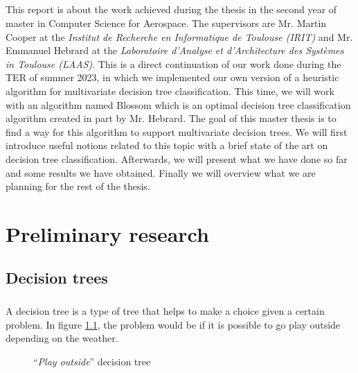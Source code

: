 \documentclass[12pt]{report}
\theoremstyle{definition}
\theoremstyle{definition}
\theoremstyle{definition}
\begin{document}
\paragraph{} This report is about the work achieved during the thesis in the second year of master in Computer
Science for Aerospace. The supervisors are Mr. Martin Cooper at the \textit{Institut de Recherche en Informatique
de Toulouse (IRIT)} and Mr. Emmanuel Hebrard at the \textit{Laboratoire d'Analyse et d'Architecture des Systèmes
in Toulouse (LAAS)}. This is a direct continuation of our work done during the TER of summer 2023, in which we
implemented our own version of a heuristic algorithm for multivariate decision tree classification. This time,
we will work with an algorithm named Blossom which is an optimal decision tree classification algorithm created
in part by Mr. Hebrard. The goal of this master thesis is to find a way for this algorithm to support
multivariate decision trees. We will first introduce useful notions related to this topic with a brief state
of the art on decision tree classification. Afterwards, we will present what we have done so far and some
results we have obtained. Finally we will overview what we are planning for the rest of the thesis.


\chapter{Preliminary research}
\section{Decision trees}

\paragraph{} A decision tree is a type of tree that helps to make a choice given a certain problem. In figure
\ref{fig:tree}, the problem would be if it is possible to go play outside depending on the weather.

\begin{figure}[h]
    \centering
    \caption{``\textit{Play outside}'' decision tree}
    \label{fig:tree}
\end{figure}
\end{document}
